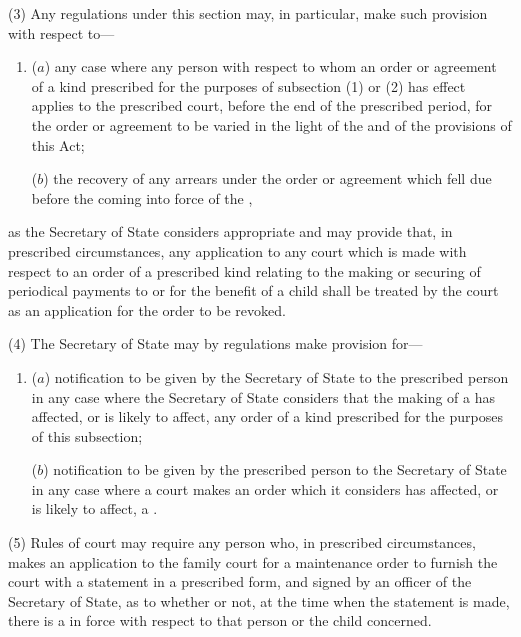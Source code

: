 \documentclass[a4paper]{article}
\begin{document}
(3)
Any regulations under this section may, in particular, make such provision
with respect to---
\begin{enumerate}\item[]
($a$)
any case where any person with respect to whom an order or agreement
of a kind prescribed for the purposes of subsection (1) or (2) has effect
applies to the prescribed court, before the end of the prescribed period,
for the order or agreement to be varied in the light of the 
and of the provisions of this Act;

($b$)
the recovery of any arrears under the order or agreement which fell due
before the coming into force of the ,
\end{enumerate}
as the Secretary of State considers appropriate and may provide that, in prescribed
circumstances, any application to any court which is made with respect to an order
of a prescribed kind relating to the making or securing of periodical payments to
or for the benefit of a child shall be treated by the court as an application for the
order to be revoked.

(4)
The Secretary of State may by regulations make provision for---
\begin{enumerate}\item[]
($a$)
notification to be given by 
the 
Secretary of State to the prescribed person
in any case where the Secretary of State considers that the making of a
has affected, or is likely
to affect, any order of a kind prescribed for the purposes of this subsection;

($b$)
notification to be given by the prescribed person to the Secretary of State
in any case where a court makes an order which it considers has affected,
or is likely to affect, a .
\end{enumerate}

(5) Rules 
of court may require   %
any person who, in prescribed circumstances, makes
an application to 
the family court     %
for a maintenance order to furnish the court
with a statement in a prescribed form, and signed by an officer of the Secretary of
State, as to whether or not, at the time when the statement is made, there is a
in force with respect to that person
or the child concerned.
\end{document}
